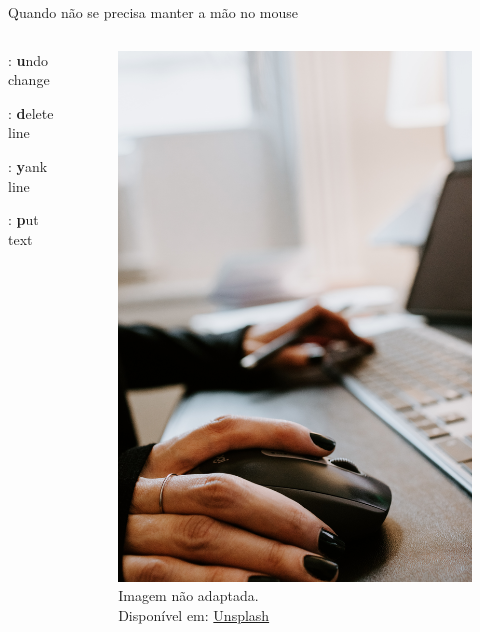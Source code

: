 \begin{frame}{Quando não se precisa manter a mão no mouse}
    \begin{columns}
        \begin{column}{0.4\linewidth}
            \begin{wideitemize}
                \item {}: \textbf{u}ndo change
                \item {}: \textbf{d}elete line
                \item {}: \textbf{y}ank line
                \item {}: \textbf{p}ut text
            \end{wideitemize}
        \end{column}
        
        \begin{column}{0.3\textwidth}
            \begin{figure}
                \includegraphics[width=\linewidth]{Image/kelly-sikkema-K5dAn1gOFEc-unsplash.jpg}
                \footnotesize
                \\ Imagem não adaptada. \\
                Disponível em:  \hyperlink{https://unsplash.com/photos/person-using-black-and-silver-laptop-computer-K5dAn1gOFEc}{Unsplash}
            \end{figure}
        \end{column}
        

\end{columns}
\end{frame}
